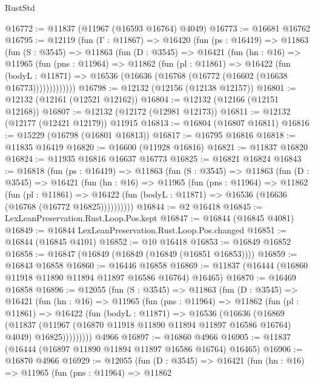 \begin{lexlean}{RustStd}
\begin{coremodule}
{\begin{coremodule}
{{{{{{{{{{{{{{{{{{{{{{{{{{{{{{{{{{{{{{{{{{{{{{{{{{@16772 := @11837 (@11967 (@16593 @16764) @4049)
@16773 := @16681 @16762
@16795 := @12119
    (fun (Γ : @11867) =>
    @16420
      (fun (ps : @16419) =>
      @11863
        (fun (S : @3545) =>
        @11863
          (fun (D : @3545) =>
          @16421
            (fun (hn : @16) =>
            @11965
              (fun (pns : @11964) =>
              @11862
                (fun (pl : @11861) =>
                @16422
                  (fun (bodyL : @11871) =>
                  @16536 (@16636 (@16768 (@16772 (@16602 (@16638 @16773)))))))))))))
@16798 := @12132 (@12156 (@12138 @12157))
@16801 := @12132 (@12161 (@12521 @12162))
@16804 := @12132 (@12166 (@12151 @12168))
@16807 := @12132 (@12172 (@12981 @12173))
@16811 := @12132 (@12177 (@12421 @12179)) @11915
@16813 := @16804 (@16807 @16811)
@16816 := @15229 (@16798 (@16801 @16813))
@16817 := @16795 @16816
@16818 := @11835 @16419
@16820 := @16600 (@11928 @16816)
@16821 := @11837 @16820
@16824 := @11935 @16816 @16637 @16773
@16825 := @16821 @16824
@16843 := @16818
    (fun (ps : @16419) =>
    @11863
      (fun (S : @3545) =>
      @11863
        (fun (D : @3545) =>
        @16421
          (fun (hn : @16) =>
          @11965
            (fun (pns : @11964) =>
            @11862
              (fun (pl : @11861) =>
              @16422 (fun (bodyL : @11871) => @16536 (@16636 (@16768 (@16772 @16825))))))))))
@16844 := @2 @16418
@16845 := LexLeanPreservation.Rust.Loop.Pos.kept
@16847 := @16844 (@16845 @4081)
@16849 := @16844 LexLeanPreservation.Rust.Loop.Pos.changed
@16851 := @16844 (@16845 @4101)
@16852 := @10 @16418
@16853 := @16849 @16852
@16858 := @16847 (@16849 (@16849 (@16849 (@16851 @16853))))
@16859 := @16843 @16858
@16860 := @16446 @16858
@16869 := @11837 (@16444 (@16860 @11918 @11890 @11894 @11897 @16586 @16764) @16465)
@16870 := @16469 @16858
@16896 := @12055
    (fun (S : @3545) =>
    @11863
      (fun (D : @3545) =>
      @16421
        (fun (hn : @16) =>
        @11965
          (fun (pns : @11964) =>
          @11862
            (fun (pl : @11861) =>
            @16422
              (fun (bodyL : @11871) =>
              @16536
                (@16636
                  (@16869
                    (@11837
                      (@11967 (@16870 @11918 @11890 @11894 @11897 @16586 @16764) @4049)
                      @16825)))))))))
    @4966
@16897 := @16860 @4966
@16905 := @11837 (@16444 (@16897 @11890 @11894 @11897 @16586 @16764) @16465)
@16906 := @16870 @4966
@16929 := @12055
    (fun (D : @3545) =>
    @16421
      (fun (hn : @16) =>
      @11965
        (fun (pns : @11964) =>
        @11862
}}}}}}}}}}}}}}}}}}}}}}}}}}}}}}}}}}}}}}}}}}}}}}}}}}
\end{coremodule}}
\end{coremodule}
\end{lexlean}
